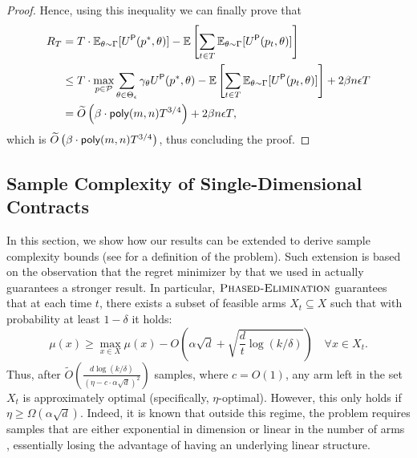 \begin{proof}
	Hence, using this inequality we can finally prove that
    \begin{align*}
        R_T&=T\cdot\mathbb{E}_{\theta\sim \Gamma}[U^\textsf{P}(p^*,\theta)]-\mathbb{E}\left[ \sum_{t \in T}  \mathbb{E}_{\theta\sim \Gamma}[U^\textsf{P}(p_t,\theta)]\right]\\
        &\le T\cdot\max_{p\in \mathcal{P}} \sum_{\theta\in\Theta_\epsilon}\gamma_\theta U^\textsf{P}(p^*,\theta)-\mathbb{E}\left[ \sum_{t \in T}  \mathbb{E}_{\theta\sim \Gamma}[U^\textsf{P}(p_t,\theta)]\right]+2\beta n\epsilon T\\
        & = \widetilde O\left(\beta \cdot\textsf{poly}(m,n) T^{3/4}\right) + 2 \beta n \epsilon T,
    \end{align*}
    which is $\widetilde O\left(\beta \cdot\textsf{poly}(m,n) T^{3/4}\right)$, thus concluding the proof.
\end{proof}

\subsection{Sample Complexity of Single-Dimensional Contracts}
In this section, we show how our results can be extended to derive sample complexity bounds (see  for a definition of the problem).
%
%
Such extension is based on the observation that the regret minimizer by \citet{lattimore2020learning} that we used in  actually guarantees a stronger result. In particular, $\textsc{Phased-Elimination}$ guarantees that at each time $t$, there exists a subset of feasible arms $X_t\subseteq X$ such that with probability at least $1-\delta$ it holds:
\[
\mu(x)\ge \max_{x\in X}\mu(x)-O\left(\alpha\sqrt{d}+\sqrt{\frac{d}{t}\log(k/\delta)}\right) \quad \forall x\in X_t.
\]
%
Thus, after $\widetilde O\left(\frac{d\log(k/\delta)}{(\eta-c\cdot\alpha\sqrt{d})^2}\right)$ samples, where $c=O(1)$, any arm left in the set $X_t$ is approximately optimal (specifically, $\eta$-optimal). However, this only holds if $\eta\ge\Omega(\alpha\sqrt{d})$. Indeed, it is known that outside this regime, the problem requires samples that are either exponential in dimension or linear in the number of arms \citep{du2019good, lattimore2020learning}, essentially losing the advantage of having an underlying linear structure.

